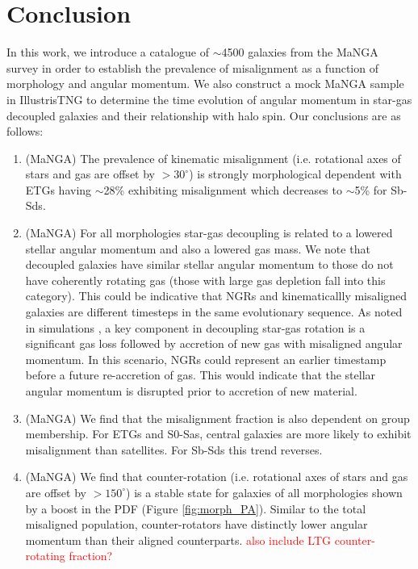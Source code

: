\documentclass[fleqn,usenatbib]{mnras}
\newcommand{\red}[1]{{\textcolor{red}{#1}}}
\begin{document}
\section{Conclusion} \label{sec:conclusion}
In this work, we introduce a catalogue of $\sim$4500 galaxies from the MaNGA survey in order to establish the prevalence of misalignment as a function of morphology and angular momentum. We also construct a mock MaNGA sample in IllustrisTNG to determine the time evolution of angular momentum in star-gas decoupled galaxies and their relationship with halo spin. Our conclusions are as follows:
\begin{enumerate}

    \item (MaNGA) The prevalence of kinematic misalignment (i.e. rotational axes of stars and gas are offset by $> 30^{\circ}$) is strongly morphological dependent with ETGs having $\sim$28\% exhibiting misalignment which decreases to $\sim$5\% for Sb-Sds.
    
    \item (MaNGA) For all morphologies star-gas decoupling is related to a lowered stellar angular momentum and also a lowered gas mass. We note that decoupled galaxies have similar stellar angular momentum to those do not have coherently rotating gas (those with large gas depletion fall into this category). This could be indicative that NGRs and kinematicallly misaligned galaxies are different timesteps in the same evolutionary sequence. As noted in simulations \citep[][]{vdvoort2015, starkenburg+19}, a key component in decoupling star-gas rotation is a significant gas loss followed by accretion of new gas with misaligned angular momentum. In this scenario, NGRs could represent an earlier timestamp before a future re-accretion of gas. This would indicate that the stellar angular momentum is disrupted prior to accretion of new material. 
    \item (MaNGA) We find that the misalignment fraction is also dependent on group membership. For ETGs and S0-Sas, central galaxies are more likely to exhibit misalignment than satellites. For Sb-Sds this trend reverses.
    
    \item (MaNGA) We find that counter-rotation (i.e. rotational axes of stars and gas are offset by $> 150^{\circ}$) is a stable state for galaxies of all morphologies shown by a boost in the PDF (Figure \ref{fig:morph_PA}). Similar to the total misaligned population, counter-rotators have distinctly lower angular momentum than their aligned counterparts. \red{also include LTG counter-rotating fraction?}
    

\end{enumerate}
\end{document}

